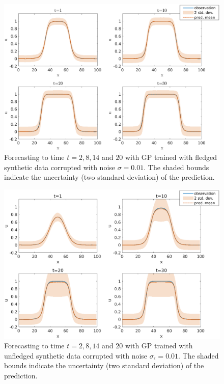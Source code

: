 \documentclass[smallextended,natbib]{svjour3}       %
\begin{document}
\begin{figure}[ht]
\centerline{\includegraphics[width=\textwidth]{chapterGP/figures/bistable}}
\caption{\label{fig:u subplot ic1} Forecasting to time $t=2,8,14$ and $20$ with GP trained with fledged synthetic data corrupted with noise $\sigma=0.01$. The shaded bounds indicate the uncertainty (two standard deviation) of the prediction.} 
\end{figure}

\begin{figure}[h]
\centerline{\includegraphics[width=\textwidth]{chapterGP/figures/bistable-short}}
\caption[Forecasting to Time $t=2,8,14$ and $20$ with GP Trained with Unfledged Synthetic Data]{\label{fig:u subplot ic2} Forecasting to time $t=2,8,14$ and $20$ with GP trained with unfledged synthetic data corrupted with noise $\sigma_{\epsilon}=0.01$. The shaded bounds indicate the uncertainty (two standard deviation) of the prediction.}
\end{figure}
\end{document}
